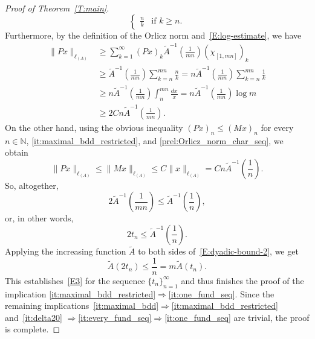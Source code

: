 \documentclass[nointlimits]{amsart}
\numberwithin{equation}{section}
\theoremstyle{plain}
\theoremstyle{definition}
\newcommand{\N}{\mathbb{N}}
\newcommand{\tA}{\tilde{A}}
\newcommand{\lAOrl}{\ell_{(A)}}
\begin{document}
\begin{proof}[Proof of Theorem~\ref{T:main}]
\begin{equation*}
\begin{cases}
        \frac{n}{k}&\text{if $k\ge n$.}        
    \end{cases}
\end{equation*}
Furthermore, by the definition of the Orlicz norm and~\eqref{E:log-estimate}, we have
\begin{align*}
    \|Px\|_{\lAOrl}
    &\ge
    \sum_{k=1}^{\infty}
    (Px)_k\tA^{-1}\left(\frac{1}{mn}\right)\left(\chi_{[1,mn]}\right)_k
        \\
    &\ge 
    \tA^{-1}\left(\frac{1}{mn}\right)
    \sum_{k=n}^{mn}\frac{n}{k}
    =
    n\tA^{-1}\left(\frac{1}{mn}\right)
    \sum_{k=n}^{mn}\frac{1}{k}
        \nonumber\\
    &\ge
    n\tA^{-1}\left(\frac{1}{mn}\right)
    \int_{n}^{mn}\frac{dx}{x}  
    =
    n\tA^{-1}\left(\frac{1}{mn}\right)
    \log m    
        \nonumber\\
    &\ge
    2Cn\tA^{-1}\left(\frac{1}{mn}\right).\nonumber
\end{align*}
On the other hand, using the obvious inequality $(Px)_n\leq (Mx)_n$ for every $n\in\N$, \ref{it:maximal_bdd_restricted}, and \eqref{prel:Orlicz_norm_char_seq}, we obtain
\begin{equation*}
    \|Px\|_{\lAOrl} \leq \|Mx\|_{\lAOrl}
    \le C\|x\|_{\lAOrl}
    = Cn\tA^{-1}\left(\frac{1}{n}\right).
\end{equation*}
So, altogether,
\begin{equation*}
    2\tA^{-1}
    \left(\frac{1}{mn}\right)
    \le
    \tA^{-1}\left(\frac{1}{n}\right),
\end{equation*}
or, in other words,
\begin{equation}
    \label{E:dyadic-bound-2}
    2t_n
    \le
    \tA^{-1}\left(\frac{1}{n}\right).
\end{equation}
Applying the increasing function $\tA$ to both sides of~\eqref{E:dyadic-bound-2}, we get
\begin{equation*}
    \tA(2t_n)
    \le
    \frac{1}{n} = m \tA(t_n).
\end{equation*}
This establishes~\eqref{E3} for the sequence $\{t_n\}_{n=1}^\infty$ and thus finishes the proof of the implication \ref{it:maximal_bdd_restricted}$\Rightarrow$\ref{it:one_fund_seq}. Since the remaining implications~\ref{it:maximal_bdd}$\Rightarrow$\ref{it:maximal_bdd_restricted}
and~\ref{it:delta20}
$\Rightarrow$\ref{it:every_fund_seq}$\Rightarrow$\ref{it:one_fund_seq} are trivial, the proof is complete.
\end{proof}
\end{document}
